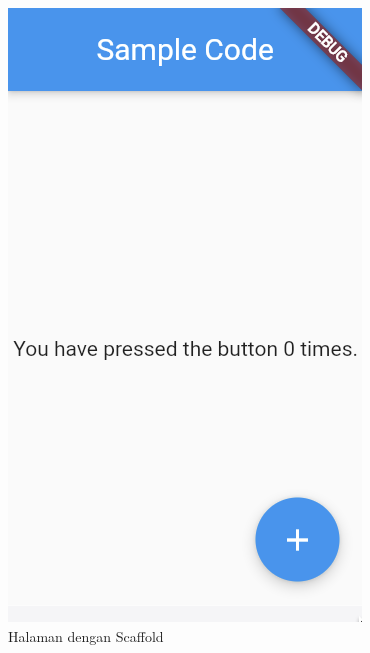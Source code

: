 \begin{spacing}{1.5}
\begin{enumerate}
	\begin{figure}[H]
		\centering
		\hspace{.15\linewidth}
		  \includegraphics[width=\linewidth]{gambar/scaffold.png}
		  \caption{Halaman dengan Scaffold}
		\endminipage\hfill

\end{figure}
\end{enumerate}
\end{spacing}
